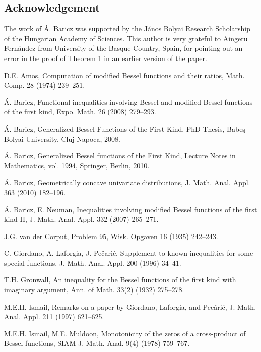 \documentclass[10pt]{amsart}
\begin{document}
\subsection*{Acknowledgement} The work of \'A. Baricz was supported by the J\'anos Bolyai Research Scholarship of
the Hungarian Academy of Sciences. This author is very grateful to Aingeru Fern\'andez from University of the Basque Country, Spain, for pointing out an error in the proof of Theorem 1 in an earlier version of the paper.

\begin{thebibliography}{}

 D.E. Amos, Computation of modified Bessel functions and their ratios, Math. Comp. 28 (1974) 239--251.

 \'A. Baricz, Functional inequalities involving Bessel and modified
Bessel functions of the first kind, Expo. Math. 26 (2008) 279--293.

 \'A. Baricz, Generalized Bessel Functions of the First Kind, PhD Thesis, Babe\c{s}-Bolyai
University, Cluj-Napoca, 2008.

 \'A. Baricz, Generalized Bessel functions of the First Kind, Lecture Notes in Mathematics, vol. 1994, Springer, Berlin, 2010.

 \'A. Baricz, Geometrically concave univariate distributions, J. Math. Anal. Appl. 363 (2010) 182--196.

 \'A. Baricz, E. Neuman, Inequalities involving modified Bessel
functions of the first kind II, J. Math. Anal. Appl. 332 (2007) 265--271.

 J.G. van der Corput, Problem 95, Wisk. Opgaven 16 (1935) 242--243.

C. Giordano, A. Laforgia, J. Pe\v{c}ari\'c, Supplement to
known inequalities for some special functions, J. Math. Anal.
Appl. 200 (1996) 34--41.

T.H. Gronwall, An inequality for the Bessel functions of the first kind with imaginary argument, Ann. of Math. 33(2)
(1932) 275--278.

M.E.H. Ismail, Remarks on a paper by Giordano, Laforgia,
and Pec\v{a}ri\'c, J. Math. Anal. Appl. 211 (1997) 621--625.

M.E.H. Ismail, M.E. Muldoon, Monotonicity of the zeros of a cross-product of
Bessel functions, SIAM J. Math. Anal. 9(4) (1978) 759--767.


\end{thebibliography}
\end{document}
